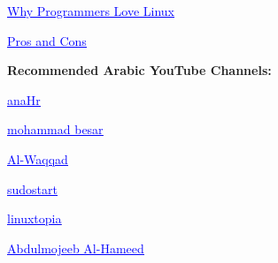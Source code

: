 \documentclass[
  english,
  paper=a4,
  oneside  ,captions=tableheading
]{scrartcl}
\begin{document}
%
  \par\vspace{0.5ex}%
  \href{https://youtu.be/otDOHt\_Jges?si=4ChY6-xpYbOdbKQ6}{\textcolor{blue}{\underline{\faLink\quad Why Programmers Love Linux}}}%
  \par\vspace{0.5ex}%

%
  \par\vspace{0.5ex}%
  \href{https://youtu.be/pYfzZRyRzvs?si=4Q5\_H0gJ3JHBodOc}{\textcolor{blue}{\underline{\faLink\quad Pros and Cons}}}%
  \par\vspace{0.5ex}%

\textbf{Recommended Arabic YouTube Channels:}

%
  \par\vspace{0.5ex}%
  \href{https://www.youtube.com/@anaHr}{\textcolor{blue}{\underline{\faLink\quad anaHr}}}%
  \par\vspace{0.5ex}%

%
  \par\vspace{0.5ex}%
  \href{https://www.youtube.com/@mmbesar}{\textcolor{blue}{\underline{\faLink\quad mohammad besar}}}%
  \par\vspace{0.5ex}%

%
  \par\vspace{0.5ex}%
  \href{https://www.youtube.com/@alwaqad}{\textcolor{blue}{\underline{\faLink\quad Al-Waqqad}}}%
  \par\vspace{0.5ex}%

%
  \par\vspace{0.5ex}%
  \href{https://www.youtube.com/@Sudo\_Start}{\textcolor{blue}{\underline{\faLink\quad sudostart}}}%
  \par\vspace{0.5ex}%

%
  \par\vspace{0.5ex}%
  \href{https://www.youtube.com/@linuxtopia}{\textcolor{blue}{\underline{\faLink\quad linuxtopia}}}%
  \par\vspace{0.5ex}%

%
  \par\vspace{0.5ex}%
  \href{https://www.youtube.com/@abdulmogeeb}{\textcolor{blue}{\underline{\faLink\quad Abdulmojeeb Al-Hameed}}}%
  \par\vspace{0.5ex}%
\end{document}
